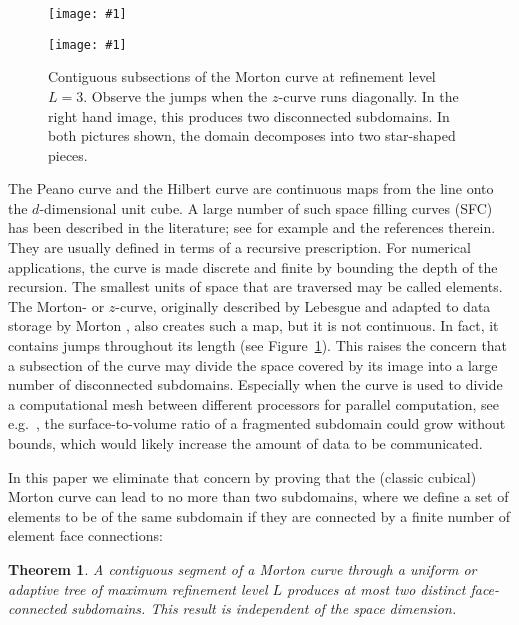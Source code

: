 \documentclass[a4paper,11pt]{article}
\newcommand{\inputtikz}[1]{\texttt{[image: \#1]}}
\newcommand{\figlab}[1]{\label{fig:#1}}
\newcommand{\figref}[1]{Figure~\ref{fig:#1}}
\newtheorem{thm}{Theorem}
\begin{document}
\begin{figure}\centering
\begin{minipage}{0.49\textwidth}\centering
    \inputtikz{morton1}
  \end{minipage}
  \begin{minipage}{0.49\textwidth}\centering
    \inputtikz{morton2}
  \end{minipage}
  \caption{Contiguous subsections of the Morton curve at refinement
           level $L = 3$.  Observe the jumps when the $z$-curve
           runs diagonally.  In the right hand image, this
           produces two disconnected subdomains.
           In both pictures shown, the domain decomposes into two star-shaped
           pieces.}
  \figlab{morton}
\end{figure}
The Peano curve \cite{Peano90} and the Hilbert curve \cite{Hilbert91} are
continuous maps from the line onto the $d$-dimensional unit cube.  A large
number of such space filling curves (SFC) has been described in the literature; see
for example \cite{Sagan94, Bader12, HaverkortWalderveen10} and the references
therein.  They are usually defined in terms of a recursive prescription.  For
numerical applications, the curve is made discrete and finite by bounding the
depth of the recursion.  The smallest units of space that are traversed may be
called elements.  The Morton- or $z$-curve, originally described by Lebesgue
\cite{Lebesgue04} and adapted to data storage by Morton \cite{Morton66}, also
creates such a map, but it is not continuous.  In fact, it contains jumps
throughout its length (see \figref{morton}).  This raises the concern that a
subsection of the curve may divide the space covered by its image into a large
number of disconnected subdomains.  Especially when the curve is used to divide
a computational mesh between different processors for parallel computation, see
e.g.\ \cite{GriebelZumbusch99, AkcelikBielakBirosEtAl03,
BursteddeGhattasGurnisEtAl10, AhimianLashukVeerapaneniEtAl10,
WeinzierlMehl11},
the surface-to-volume ratio of a fragmented subdomain could grow without
bounds, which would likely increase the amount of data to be communicated.

In this paper we eliminate that concern by proving that the (classic cubical)
Morton curve can lead to no more than two subdomains, where we define a set of
elements to be of the same subdomain if they are connected by a finite number
of element face connections:
\begin{thm}
  \label{illthmallcube}
  A contiguous segment of a Morton curve through a uniform or adaptive tree
  of maximum refinement level $L$ produces at most two distinct face-connected
  subdomains.
  This result is independent of the space dimension.
\end{thm}
\end{document}

